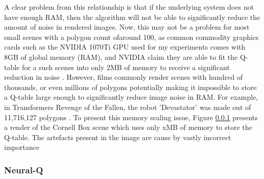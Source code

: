 \documentclass[../dissertation.tex]{subfiles}
\begin{document}

A clear problem from this relationship is that if the underlying system does not have enough RAM, then the algorithm will not be able to significantly reduce the amount of noise in rendered images. Now, this may not be a problem for most small scenes with a polygon count ofaround 100, as common commodity graphics cards such as the NVIDIA 1070Ti GPU used for my experiments comes with 8GB of global memory (RAM), and NVIDIA claim they are able to fit the Q-table for a such scenes into only 2MB of memory to receive a significant reduction in noise \cite{dahm2017learning}. However, films commonly render scenes with hundred of thousands, or even millions of polygons potentially making it impossible to store a Q-table large enough to significantly reduce image noise in RAM. For example, in Transformers Revenge of the Fallen, the robot 'Devastator' was made out of 11,716,127 polygons \cite{devastator}. To present this memory scaling issue, Figure \ref{} presents a render of the Cornell Box scene which uses only xMB of memory to store the Q-table. The artefacts present in the image are cause by vastly incorrect importance\\


\subsubsection{Neural-Q}
\end{document}
